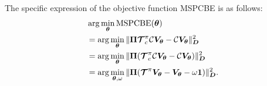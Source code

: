 The specific expression of the objective function 
MSPCBE is as follows:
\begin{align}
    \label{MSPBECwithomega}
    &\arg \min_{{\bm{\theta}}}\text{MSPCBE}({\bm{\theta}})\notag\\ 
    &= \arg \min_{{\bm{\theta}}} \|\bm{\Pi}\bm{\mathcal{T}}_c^{\pi}\mathcal{C}\bm{V}_{\bm{{\bm{\theta}}}}-\mathcal{C}\bm{V}_{\bm{{\bm{\theta}}}}\|_{\bm{D}}^2\notag\\
    &= \arg \min_{{\bm{\theta}}} \|\bm{\Pi}(\bm{\mathcal{T}}_c^{\pi}\mathcal{C}\bm{V}_{\bm{{\bm{\theta}}}}-\mathcal{C}\bm{V}_{\bm{{\bm{\theta}}}})\|_{\bm{D}}^2\notag\\
    &= \arg \min_{{\bm{\theta}},\omega}\| {\bm{\Pi}} (\bm{\mathcal{T}}^{\pi}\bm{V}_{\bm{{\bm{\theta}}}} - \bm{V}_{\bm{{\bm{\theta}}}}-\omega\bm{1}) \|_{\bm{D}}^2\notag.
\end{align}
